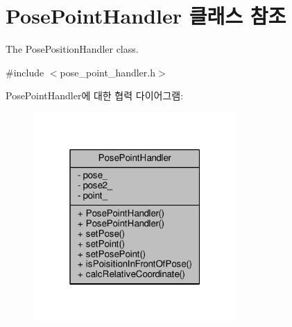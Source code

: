 \hypertarget{class_pose_point_handler}{}\section{Pose\+Point\+Handler 클래스 참조}
\label{class_pose_point_handler}


The Pose\+Position\+Handler class.  




{\ttfamily \#include $<$pose\+\_\+point\+\_\+handler.\+h$>$}



Pose\+Point\+Handler에 대한 협력 다이어그램\+:\nopagebreak
\begin{figure}[H]
\begin{center}
\leavevmode
\includegraphics[width=220pt]{class_pose_point_handler__coll__graph}
\end{center}
\end{figure}
